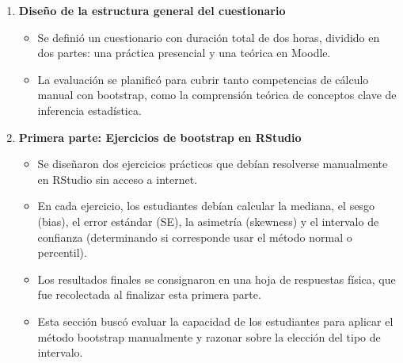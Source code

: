 \documentclass[letter,oneside,12pt,spanish]{report}
\begin{document}
\begin{enumerate}
	\item \textbf{Diseño de la estructura general del cuestionario}  
	\begin{itemize}
		\item Se definió un cuestionario con duración total de dos horas, dividido en dos partes: una práctica presencial y una teórica en Moodle.
		\item La evaluación se planificó para cubrir tanto competencias de cálculo manual con bootstrap, como la comprensión teórica de conceptos clave de inferencia estadística.
	\end{itemize}
	
	\item \textbf{Primera parte: Ejercicios de bootstrap en RStudio}  
	\begin{itemize}
		\item Se diseñaron dos ejercicios prácticos que debían resolverse manualmente en RStudio sin acceso a internet.
		\item En cada ejercicio, los estudiantes debían calcular la mediana, el sesgo (bias), el error estándar (SE), la asimetría (skewness) y el intervalo de confianza (determinando si corresponde usar el método normal o percentil).
		\item Los resultados finales se consignaron en una hoja de respuestas física, que fue recolectada al finalizar esta primera parte.
		\item Esta sección buscó evaluar la capacidad de los estudiantes para aplicar el método bootstrap manualmente y razonar sobre la elección del tipo de intervalo.
	\end{itemize}
	

\end{enumerate}
\end{document}
